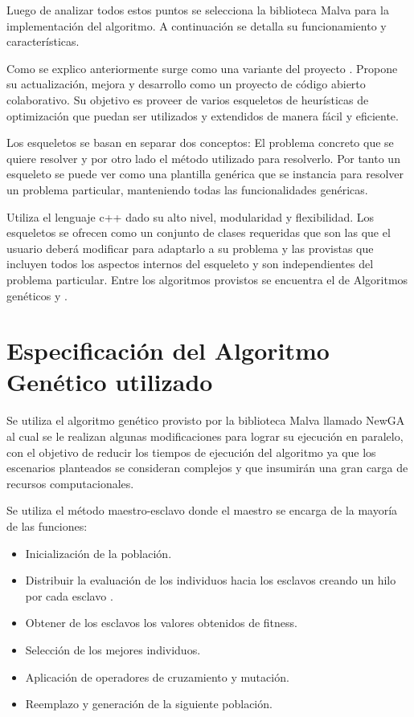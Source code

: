 Luego de analizar todos estos puntos se selecciona la biblioteca Malva para la implementación del algoritmo. A continuación se detalla su funcionamiento y características.


Como se explico anteriormente \citet{Malva} surge como una variante del proyecto \citet{Mallba}. Propone su actualización, mejora y desarrollo como un proyecto de código abierto colaborativo.  Su objetivo es proveer de varios esqueletos de  heurísticas de optimización que puedan ser utilizados y extendidos de manera fácil y eficiente.

Los esqueletos se basan en separar dos conceptos: El problema concreto que se quiere resolver y por otro lado el método utilizado para resolverlo. Por tanto un esqueleto se puede ver como una plantilla genérica que se instancia para resolver un problema particular, manteniendo todas las funcionalidades genéricas.

Utiliza el lenguaje c++ dado su alto nivel, modularidad y flexibilidad. Los esqueletos se ofrecen como un conjunto de clases requeridas que son las que el usuario deberá modificar para adaptarlo a su problema y las provistas que incluyen todos los aspectos internos del esqueleto y son independientes del problema particular. Entre los algoritmos provistos se encuentra el de Algoritmos genéticos y \citet{CHC}.



\newpage

\section{Especificación del Algoritmo Genético utilizado}
Se utiliza el algoritmo genético provisto por la biblioteca  Malva  llamado NewGA al cual se le realizan algunas modificaciones para lograr su ejecución en paralelo, con el objetivo de reducir los tiempos de ejecución del algoritmo ya que los escenarios planteados se consideran complejos y que insumirán una gran carga de recursos computacionales.

Se utiliza el método maestro-esclavo donde el maestro se encarga de la mayoría de las funciones:

\begin{itemize}
\item Inicialización de la población.
\item Distribuir la evaluación de los individuos hacia los esclavos creando un hilo por cada esclavo	.
\item Obtener de los esclavos los valores obtenidos de fitness.
\item Selección de los mejores individuos.
\item Aplicación de operadores de cruzamiento y mutación.
\item Reemplazo y generación de la siguiente población.
\end{itemize}

